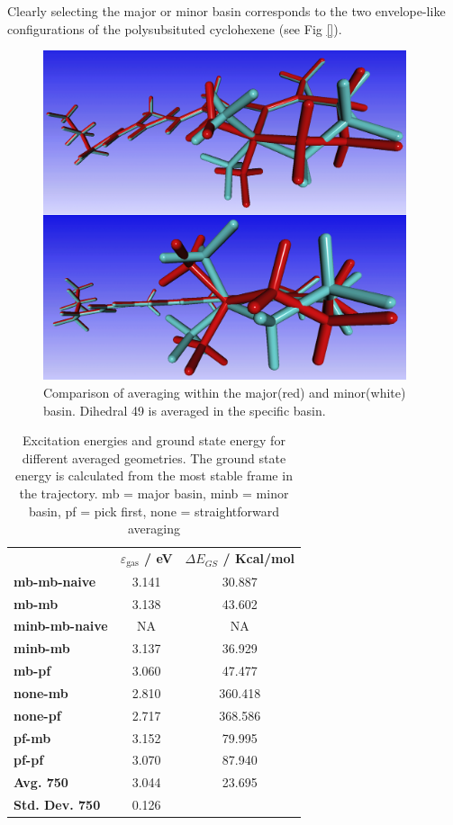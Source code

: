 \documentclass[twoside, 12pt]{article}
\begin{document}
Clearly selecting the major or minor basin corresponds to the two envelope-like configurations of the polysubsituted cyclohexene (see Fig \ref{}).

\begin{figure}[H]
\centering
\includegraphics[width=0.95\textwidth]{./figures/mb_minb_comp.png}
\caption{Comparison of averaging within the major(red) and minor(white) basin. Dihedral 49 is averaged in the specific basin.} 
\label{fig:dih49dih52}
\end{figure}

\begin{table}[h]
\footnotesize
\centering
\caption{Excitation energies and ground state energy for different averaged geometries. The ground state energy is calculated from the most stable frame in the trajectory. mb = major basin, minb = minor basin, pf = pick first, none = straightforward averaging}
\label{tab:ex_ret_avrg}
\begin{tabular}{lcc}
& \textbf{$\varepsilon_\mathrm{gas}$ / eV} & \textbf{$\Delta E_{GS}$ / Kcal/mol}  \\ 
\textbf{mb-mb-naive} & 3.141 & 30.887\\ 
\textbf{mb-mb} & 3.138 & 43.602\\
\textbf{minb-mb-naive} & NA & NA \\
\textbf{minb-mb} & 3.137 & 36.929\\
\textbf{mb-pf} & 3.060 & 47.477\\ 
\textbf{none-mb} & 2.810 & 360.418\\ 
\textbf{none-pf} & 2.717 & 368.586\\ 
\textbf{pf-mb} &  3.152 & 79.995\\ 
\textbf{pf-pf} & 3.070 & 87.940\\ 
\textbf{Avg. 750} &  3.044 & 23.695\\ 
\textbf{Std. Dev. 750} &  0.126\\ 
\end{tabular}
\end{table}
\end{document}
